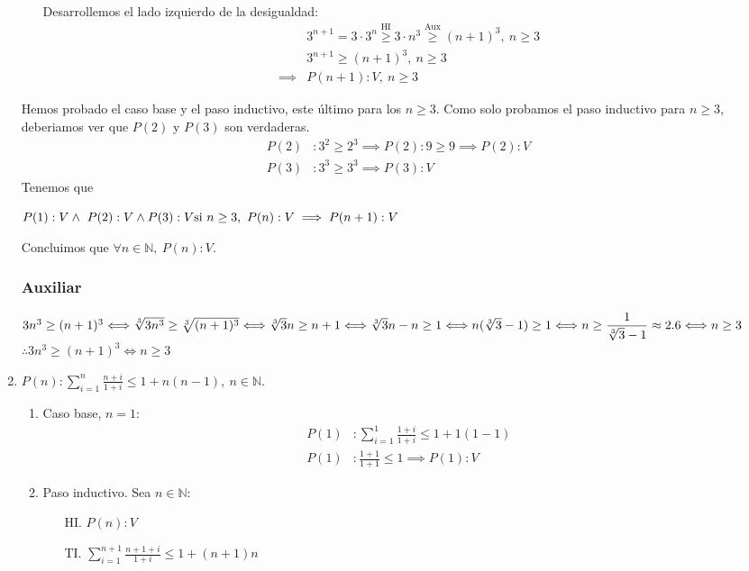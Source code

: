 \begin{enumerate}[label=\roman*)]
\begin{enumerate}[label=\arabic*)]
        Desarrollemos el lado izquierdo de la desigualdad:
        \begin{align*}
             &3^{n+1} = 3 \cdot 3^n \overset{\text{HI}}{\geq} 3 \cdot n^3 \overset{\text{Aux}}{\geq} (n+1)^3, \ n \geq 3 \\
             &3^{n+1} \geq (n+1)^3, \ n \geq 3 \\
            \implies &P(n+1): V, \ n \geq 3
        \end{align*}
    \end{enumerate}

    Hemos probado el caso base y el paso inductivo, este último para los $n \geq 3$. Como solo probamos el paso 
    inductivo para $n \geq 3$, deberiamos ver que $P(2)$ y $P(3)$ son verdaderas.
        \begin{align*}
            P(2)&: 3^2 \geq 2^3 \implies P(2): 9 \geq 9 \implies P(2): V \\
            P(3)&: 3^3 \geq 3^3 \implies P(3): V 
        \end{align*}
    Tenemos que 

    $P(1): V \land \ P(2): V \land  P(3): V \\
    \text{si } n \geq 3, \ P(n): V \implies P(n+1): V$ 

    Concluimos que $\forall n \in \mathbb{N}, \ P(n): V$. 

    \subsubsection*{Auxiliar}
    $3n^3 \geq (n+1)^3 \Longleftrightarrow \sqrt[3]{3n^3} \geq \sqrt[3]{(n+1)^3} \Longleftrightarrow 
    \sqrt[3]{3}n \geq n+1 \Longleftrightarrow \sqrt[3]{3}n - n \geq 1 \\
    \Longleftrightarrow n(\sqrt[3]{3} - 1) \geq 1 \Longleftrightarrow \displaystyle n \geq \frac{1}{\sqrt[3]{3} - 1} 
    \approx 2.6 \Longleftrightarrow n \geq 3$ \\
    $\therefore 3n^3 \geq (n+1)^3 \Longleftrightarrow n \geq 3$


    \item $P(n): \displaystyle \sum_{i=1}^{n} \frac{n+i}{1+i} \leq 1 + n(n-1), \ n \in \mathbb{N}$.
    \begin{enumerate}[label=\arabic*)]
        \item Caso base, $n = 1$:
        \begin{align*}
            P(1)&: \sum_{i=1}^{1} \frac{1+i}{1+i} \leq 1 + 1(1-1) \\
            P(1)&: \frac{1+1}{1+1}\leq 1 \implies P(1): V
        \end{align*}
        \item Paso inductivo. Sea $n \in \mathbb{N}$:
        \begin{enumerate}
            \item[HI.] $P(n): V$
            \item[TI.] $\displaystyle \sum_{i=1}^{n+1} \frac{n+1+i}{1+i} \leq 1 + (n+1)n$ 
        \end{enumerate}


\end{enumerate}
\end{enumerate}
